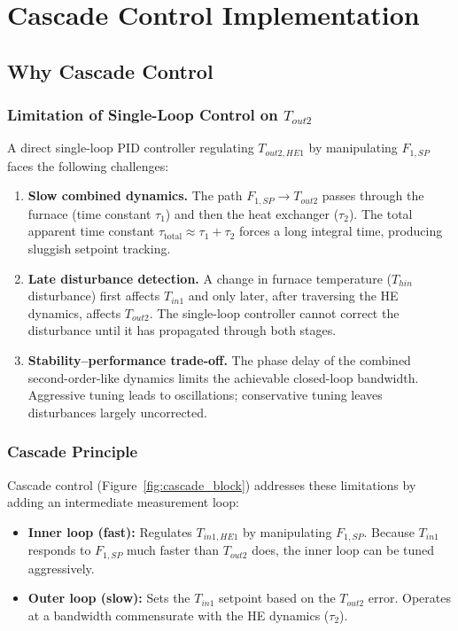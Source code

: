 \chapter{Cascade Control Implementation}

\section{Why Cascade Control}

\subsection{Limitation of Single-Loop Control on $T_{out2}$}

A direct single-loop PID controller regulating $T_{out2,HE1}$ by manipulating $F_{1,SP}$
faces the following challenges:

\begin{enumerate}[leftmargin=*, itemsep=4pt]
  \item \textbf{Slow combined dynamics.}
    The path $F_{1,SP} \rightarrow T_{out2}$ passes through the furnace (time constant
    $\tau_1$) and then the heat exchanger ($\tau_2$). The total apparent time constant
    $\tau_{\text{total}} \approx \tau_1 + \tau_2$ forces a long integral time, producing
    sluggish setpoint tracking.

  \item \textbf{Late disturbance detection.}
    A change in furnace temperature ($T_{hin}$ disturbance) first affects $T_{in1}$ and
    only later, after traversing the HE dynamics, affects $T_{out2}$. The single-loop
    controller cannot correct the disturbance until it has propagated through both stages.

  \item \textbf{Stability--performance trade-off.}
    The phase delay of the combined second-order-like dynamics limits the achievable
    closed-loop bandwidth. Aggressive tuning leads to oscillations; conservative tuning
    leaves disturbances largely uncorrected.
\end{enumerate}

\subsection{Cascade Principle}

Cascade control (Figure~\ref{fig:cascade_block}) addresses these limitations by adding an
intermediate measurement loop:

\begin{itemize}[leftmargin=*, itemsep=3pt]
  \item \textbf{Inner loop (fast):} Regulates $T_{in1,HE1}$ by manipulating $F_{1,SP}$.
    Because $T_{in1}$ responds to $F_{1,SP}$ much faster than $T_{out2}$ does, the inner
    loop can be tuned aggressively.
  \item \textbf{Outer loop (slow):} Sets the $T_{in1}$ setpoint based on the $T_{out2}$
    error. Operates at a bandwidth commensurate with the HE dynamics ($\tau_2$).
\end{itemize}


